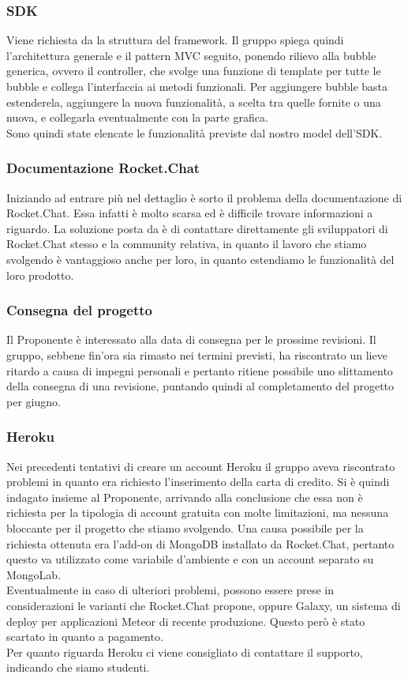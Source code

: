 \subsubsection{SDK}
Viene richiesta da \Proponente{} la struttura del framework. Il gruppo spiega quindi l'architettura generale e il pattern MVC seguito, ponendo rilievo alla bubble generica, ovvero il controller, che svolge una funzione di template per tutte le bubble e collega l'interfaccia ai metodi funzionali. Per aggiungere bubble basta estenderela, aggiungere la nuova funzionalità, a scelta tra quelle fornite o una nuova, e collegarla eventualmente con la parte grafica.\\
Sono quindi state elencate le funzionalità previste dal nostro model dell'SDK.

\subsubsection{Documentazione Rocket.Chat}
Iniziando ad entrare più nel dettaglio è sorto il problema della documentazione di Rocket.Chat. Essa infatti è molto scarsa ed è difficile trovare informazioni a riguardo. La soluzione posta da \Proponente{} è di contattare direttamente gli sviluppatori di Rocket.Chat stesso e la community relativa, in quanto il lavoro che stiamo svolgendo è vantaggioso anche per loro, in quanto estendiamo le funzionalità del loro prodotto.

\subsubsection{Consegna del progetto}
Il Proponente è interessato alla data di consegna per le prossime revisioni. Il gruppo, sebbene fin'ora sia rimasto nei termini previsti, ha riscontrato un lieve ritardo a causa di impegni personali e pertanto ritiene possibile uno slittamento della consegna di una revisione, puntando quindi al completamento del progetto per giugno.

\subsubsection{Heroku}
Nei precedenti tentativi di creare un account Heroku il gruppo aveva riscontrato problemi in quanto era richiesto l'inserimento della carta di credito. Si è quindi indagato insieme al Proponente, arrivando alla conclusione che essa non è richiesta per la tipologia di account gratuita con molte limitazioni, ma nessuna bloccante per il progetto che stiamo svolgendo. Una causa possibile per la richiesta ottenuta era l'add-on di MongoDB installato da Rocket.Chat, pertanto questo va utilizzato come variabile d'ambiente e con un account separato su MongoLab. \\
Eventualmente in caso di ulteriori problemi, possono essere prese in considerazioni le varianti che Rocket.Chat propone, oppure Galaxy, un sistema di deploy per applicazioni Meteor di recente produzione. Questo però è stato scartato in quanto a pagamento.\\
Per quanto riguarda Heroku ci viene consigliato di contattare il supporto, indicando che siamo studenti.

